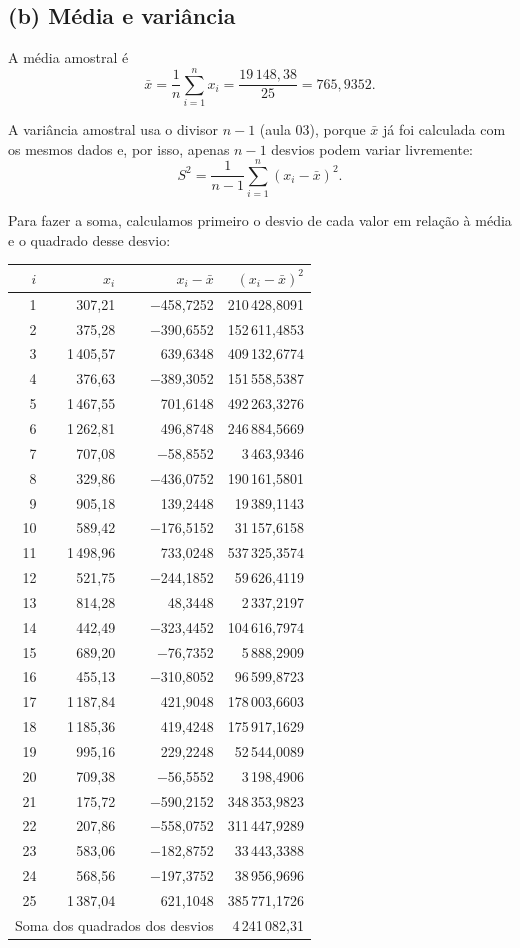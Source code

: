 \documentclass[12pt,a4paper]{article}
\newcommand{\xb}{\bar{x}}
\begin{document}
\subsection*{(b) Média e variância}

A média amostral é
$$\xb = \frac{1}{n}\sum_{i=1}^{n} x_i = \frac{19\,148{,}38}{25} = 765{,}9352.$$

A variância amostral usa o divisor $n-1$ (aula 03), porque $\xb$ já foi calculada com os mesmos dados e, por isso, apenas $n-1$ desvios podem variar livremente:
$$S^2 = \frac{1}{n-1}\sum_{i=1}^{n}(x_i - \xb)^2.$$

Para fazer a soma, calculamos primeiro o desvio de cada valor em relação à média e o quadrado desse desvio:

{\footnotesize\renewcommand{\arraystretch}{0.92}
\begin{longtable}{rrrr}
\toprule
$i$ & $x_i$ & $x_i - \xb$ & $(x_i - \xb)^2$ \\
\midrule
\endhead
1 & 307,21 & $-$458,7252 & 210\,428,8091 \\
2 & 375,28 & $-$390,6552 & 152\,611,4853 \\
3 & 1\,405,57 & 639,6348 & 409\,132,6774 \\
4 & 376,63 & $-$389,3052 & 151\,558,5387 \\
5 & 1\,467,55 & 701,6148 & 492\,263,3276 \\
6 & 1\,262,81 & 496,8748 & 246\,884,5669 \\
7 & 707,08 & $-$58,8552 & 3\,463,9346 \\
8 & 329,86 & $-$436,0752 & 190\,161,5801 \\
9 & 905,18 & 139,2448 & 19\,389,1143 \\
10 & 589,42 & $-$176,5152 & 31\,157,6158 \\
11 & 1\,498,96 & 733,0248 & 537\,325,3574 \\
12 & 521,75 & $-$244,1852 & 59\,626,4119 \\
13 & 814,28 & 48,3448 & 2\,337,2197 \\
14 & 442,49 & $-$323,4452 & 104\,616,7974 \\
15 & 689,20 & $-$76,7352 & 5\,888,2909 \\
16 & 455,13 & $-$310,8052 & 96\,599,8723 \\
17 & 1\,187,84 & 421,9048 & 178\,003,6603 \\
18 & 1\,185,36 & 419,4248 & 175\,917,1629 \\
19 & 995,16 & 229,2248 & 52\,544,0089 \\
20 & 709,38 & $-$56,5552 & 3\,198,4906 \\
21 & 175,72 & $-$590,2152 & 348\,353,9823 \\
22 & 207,86 & $-$558,0752 & 311\,447,9289 \\
23 & 583,06 & $-$182,8752 & 33\,443,3388 \\
24 & 568,56 & $-$197,3752 & 38\,956,9696 \\
25 & 1\,387,04 & 621,1048 & 385\,771,1726 \\
\midrule
\multicolumn{3}{r}{Soma dos quadrados dos desvios} & 4\,241\,082,31 \\
\bottomrule
\end{longtable}
}
\end{document}
